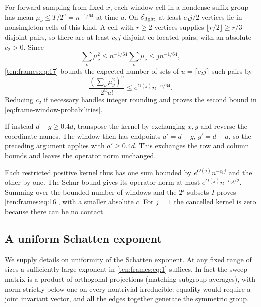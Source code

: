 For forward sampling from fixed $x$, each window cell in a nondense suffix group has mean $\mu_\nu\le T/2^a=n^{-1/64}$ at time $a$. On $\mathcal E_{\rm light}$ at least $c_0j/2$ vertices lie in nonsingleton cells of this kind. A cell with $r\ge2$ vertices supplies $\lfloor r/2\rfloor\ge r/3$ disjoint pairs, so there are at least $c_2j$ disjoint co-located pairs, with an absolute $c_2>0$. Since
\[
 \sum_\nu\mu_\nu^2\le n^{-1/64}\sum_\nu\mu_\nu\le j n^{-1/64},
\]
\eqref{ten:frames:eq:17} bounds the expected number of sets of $u=\lceil c_2j\rceil$ such pairs by
\[
 \frac{(\sum_\nu\mu_\nu^2)^u}{2^u u!}
 \le e^{O(j)}n^{-u/64}.
\]
Reducing $c_2$ if necessary handles integer rounding and proves the second bound in \eqref{eq:frame-window-probabilities}.

If instead $d-g\ge0.4d$, transpose the kernel by exchanging $x,y$ and reverse the coordinate names. The window then has endpoints $a'=d-g$, $g'=d-a$, so the preceding argument applies with $a'\ge0.4d$. This exchanges the row and column bounds and leaves the operator norm unchanged.

Each restricted positive kernel thus has one sum bounded by $e^{O(j)}n^{-c_1j}$ and the other by one. The Schur bound gives its operator norm at most $e^{O(j)}n^{-c_1j/2}$. Summing over the bounded number of windows and the $2^j$ subsets $I$ proves \eqref{ten:frames:eq:16}, with a smaller absolute $c$. For $j=1$ the cancelled kernel is zero because there can be no contact.

\subsection{A uniform Schatten exponent}
\label{ten:frames:part:206}
We supply details on uniformity of the Schatten exponent. At any fixed range of sizes a sufficiently large exponent in \eqref{ten:frames:eq:1} suffices. In fact the sweep matrix is a product of orthogonal projections (matching subgroup averages), with norm strictly below one on every nontrivial irreducible: equality would require a joint invariant vector, and all the edges together generate the symmetric group.

